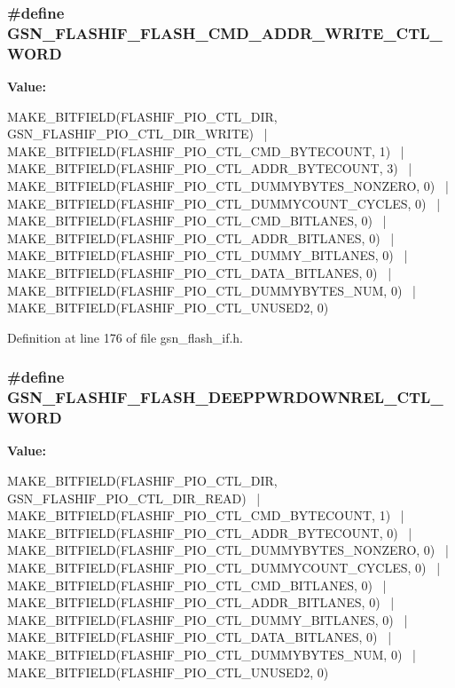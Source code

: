 \hypertarget{a00501_af14e1b5c6e46794277b498c70f9be271}{
\subsubsection[{GSN\_\-FLASHIF\_\-FLASH\_\-CMD\_\-ADDR\_\-WRITE\_\-CTL\_\-WORD}]{\setlength{\rightskip}{0pt plus 5cm}\#define GSN\_\-FLASHIF\_\-FLASH\_\-CMD\_\-ADDR\_\-WRITE\_\-CTL\_\-WORD}}
\label{a00501_af14e1b5c6e46794277b498c70f9be271}
{\bfseries Value:}
\begin{DoxyCode}
MAKE_BITFIELD(FLASHIF_PIO_CTL_DIR, GSN_FLASHIF_PIO_CTL_DIR_WRITE) \
        | MAKE_BITFIELD(FLASHIF_PIO_CTL_CMD_BYTECOUNT, 1) \
        | MAKE_BITFIELD(FLASHIF_PIO_CTL_ADDR_BYTECOUNT, 3) \
        | MAKE_BITFIELD(FLASHIF_PIO_CTL_DUMMYBYTES_NONZERO, 0) \
        | MAKE_BITFIELD(FLASHIF_PIO_CTL_DUMMYCOUNT_CYCLES, 0) \
        | MAKE_BITFIELD(FLASHIF_PIO_CTL_CMD_BITLANES, 0) \
        | MAKE_BITFIELD(FLASHIF_PIO_CTL_ADDR_BITLANES, 0) \
        | MAKE_BITFIELD(FLASHIF_PIO_CTL_DUMMY_BITLANES, 0) \
        | MAKE_BITFIELD(FLASHIF_PIO_CTL_DATA_BITLANES, 0) \
        | MAKE_BITFIELD(FLASHIF_PIO_CTL_DUMMYBYTES_NUM, 0) \
        | MAKE_BITFIELD(FLASHIF_PIO_CTL_UNUSED2, 0)
\end{DoxyCode}


Definition at line 176 of file gsn\_\-flash\_\-if.h.

\hypertarget{a00501_a82c4245515ddf32d66c496d5c01545c8}{
\subsubsection[{GSN\_\-FLASHIF\_\-FLASH\_\-DEEPPWRDOWNREL\_\-CTL\_\-WORD}]{\setlength{\rightskip}{0pt plus 5cm}\#define GSN\_\-FLASHIF\_\-FLASH\_\-DEEPPWRDOWNREL\_\-CTL\_\-WORD}}
\label{a00501_a82c4245515ddf32d66c496d5c01545c8}
{\bfseries Value:}
\begin{DoxyCode}
MAKE_BITFIELD(FLASHIF_PIO_CTL_DIR, GSN_FLASHIF_PIO_CTL_DIR_READ) \
        | MAKE_BITFIELD(FLASHIF_PIO_CTL_CMD_BYTECOUNT, 1) \
        | MAKE_BITFIELD(FLASHIF_PIO_CTL_ADDR_BYTECOUNT, 0) \
        | MAKE_BITFIELD(FLASHIF_PIO_CTL_DUMMYBYTES_NONZERO, 0) \
        | MAKE_BITFIELD(FLASHIF_PIO_CTL_DUMMYCOUNT_CYCLES, 0) \
        | MAKE_BITFIELD(FLASHIF_PIO_CTL_CMD_BITLANES, 0) \
        | MAKE_BITFIELD(FLASHIF_PIO_CTL_ADDR_BITLANES, 0) \
        | MAKE_BITFIELD(FLASHIF_PIO_CTL_DUMMY_BITLANES, 0) \
        | MAKE_BITFIELD(FLASHIF_PIO_CTL_DATA_BITLANES, 0) \
        | MAKE_BITFIELD(FLASHIF_PIO_CTL_DUMMYBYTES_NUM, 0) \
        | MAKE_BITFIELD(FLASHIF_PIO_CTL_UNUSED2, 0)
\end{DoxyCode}


